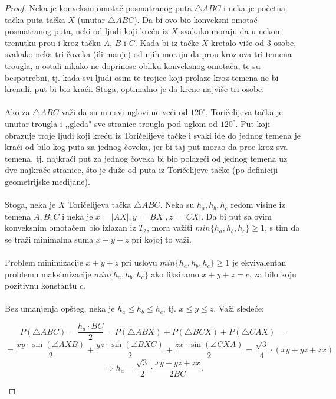 \documentclass[11pt,letter]{article}
\begin{document}
\begin{proof}
Neka je konveksni omota\v c posmatranog puta $\bigtriangleup ABC$ i neka je po\v cetna ta\v cka puta ta\v cka $X$ (unutar $\bigtriangleup ABC$). Da bi ovo bio konveksni omota\v c posmatranog puta, neki od ljudi koji kre\' cu iz $X$ svakako moraju da u nekom trenutku pro\dj u i kroz ta\v cku $A$, $B$ i $C$. Kada bi iz ta\v cke $X$ kretalo vi\v se od 3 osobe, svakako neka tri \v coveka (ili manje) od njih moraju da pro\dj u kroz ova tri temena trougla, a ostali nikako ne doprinose obliku konveksnog omota\v ca, te su bespotrebni, tj. kada svi ljudi osim te trojice koji prolaze kroz temena ne bi krenuli, put bi bio kra\' ci. Stoga, optimalno je da krene najvi\v se tri osobe. 
\\
\\
\indent Ako za $\bigtriangleup ABC$ va\v zi da su mu svi uglovi ne ve\' ci od $120^\circ$, Tori\v celijeva ta\v cka je unutar trougla i ,,gleda" sve stranice trougla pod uglom od $120^\circ$. Put koji obrazuje troje ljudi koji kre\' cu iz Tori\v celijeve ta\v cke i svaki ide do jednog temena je kra\' ci od bilo kog puta za jednog \v coveka, jer bi taj put morao da pro\dj e kroz sva temena, tj. najkra\' ci put za jednog \v coveka bi bio polaze\' ci od jednog temena uz dve najkra\' ce stranice, \v sto je du\v ze od puta iz Tori\v celijeve ta\v cke (po definiciji geometrijske medijane).
\\
\\
\indent Stoga, neka je $X$ Tori\v celijeva ta\v cka $\bigtriangleup ABC$. Neka su $h_a, h_b, h_c$ redom visine iz temena $A, B, C$ i neka je $x=|AX|, y=|BX|, z=|CX|$. Da bi put sa ovim konveksnim omota\v cem bio izlazan iz $T_2$, mora va\v ziti $min\{h_a,h_b,h_c\}\geqslant 1$, s tim da se tra\v zi minimalna suma $x+y+z$ pri kojoj to va\v zi.
\\
\\
\indent Problem minimizacije $x+y+z$ pri uslovu $min\{h_a,h_b,h_c\}\geqslant 1$ je ekvivalentan problemu maksimizacije $min\{h_a,h_b,h_c\}$ ako fiksiramo $x+y+z=c$, za bilo koju pozitivnu konstantu $c$.
\\
\\
\indent Bez umanjenja op\v steg, neka je $h_a\leqslant h_b\leqslant h_c$, tj. $x\leqslant y\leqslant z$. Va\v zi slede\' ce:
\begin{center}
$$P(\bigtriangleup ABC)=\frac{h_a\cdot BC}{2}=P(\bigtriangleup ABX)+P(\bigtriangleup BCX)+P(\bigtriangleup CAX)=$$
$$=\frac{xy\cdot \sin{(\angle AXB)}}{2}+\frac{yz\cdot \sin{(\angle BXC)}}{2}+\frac{zx\cdot \sin(\angle CXA)}{2}=\frac{\sqrt3}{4}\cdot(xy+yz+zx)$$
$$\Longrightarrow h_a=\frac{\sqrt3}{2}\cdot \frac{xy+yz+zx}{2BC}.$$
\end{center}
\end{proof} 
\smallskip
\end{document}
